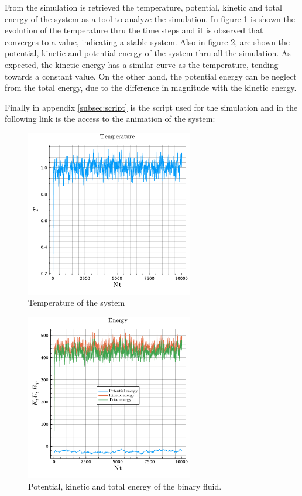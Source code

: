 \documentclass[main.tex]{subfiles}
\begin{document}
From the simulation is retrieved the temperature, potential, kinetic and total energy of the system as a tool to analyze the simulation.
In figure \ref{fig:temp} is shown the evolution of the temperature thru the time steps and it is observed that converges to a value, indicating a stable system.
Also in figure \ref{fig:energy}, are shown the potential, kinetic and potential energy of the system thru all the simulation.
As expected, the kinetic energy has a similar curve as the temperature, tending towards a constant value.
On the other hand, the potential energy can be neglect from the total energy, due to the difference in magnitude with the kinetic energy.

Finally in appendix \ref{subsec:script} is the script used for the simulation and in the following link is the access to the animation of the system:
\href{https://tecmx-my.sharepoint.com/:i:/g/personal/a00827546_tec_mx/Edb0vAaSVpNMnYdZ_XIKdA0B2H9gE0njt1jfPwtb59KdlA?email=leogabac%40tec.mx&e=NaACb8}{\color{blue}{Access to the animation}}


\begin{figure}[ht]
    \centering
    \includegraphics[width=0.65\textwidth]{imgs/hw3/temperature.pdf}
    \caption{Temperature of the system}
    \label{fig:temp}
\end{figure}

\begin{figure}[ht]
    \centering
    \includegraphics[width=0.65\textwidth]{imgs/hw3/energy.pdf}
    \caption{Potential, kinetic and total energy of the binary fluid.}
    \label{fig:energy}
\end{figure}
\end{document}
